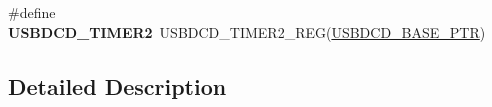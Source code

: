 \begin{DoxyCompactItemize}
\item 
\hypertarget{group___u_s_b_d_c_d___register___accessor___macros_gace4d8422fa65db55d5ebf6e94912d702}{}\#define {\bfseries U\+S\+B\+D\+C\+D\+\_\+\+T\+I\+M\+E\+R2}~U\+S\+B\+D\+C\+D\+\_\+\+T\+I\+M\+E\+R2\+\_\+\+R\+E\+G(\hyperlink{group___u_s_b_d_c_d___peripheral_ga6289dc687e9b991508629237aeb61755}{U\+S\+B\+D\+C\+D\+\_\+\+B\+A\+S\+E\+\_\+\+P\+T\+R})\label{group___u_s_b_d_c_d___register___accessor___macros_gace4d8422fa65db55d5ebf6e94912d702}

\end{DoxyCompactItemize}


\subsection{Detailed Description}
